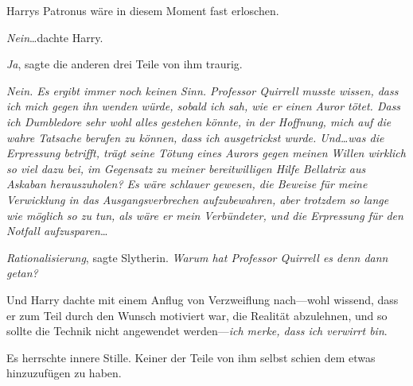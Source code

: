 Harrys Patronus wäre in diesem Moment fast erloschen.

\emph{Nein}…dachte Harry.

\emph{Ja}, sagte die anderen drei Teile von ihm traurig.

\emph{Nein. Es ergibt immer noch keinen Sinn. Professor Quirrell musste wissen, dass ich mich gegen ihn wenden würde, sobald ich sah, wie er einen Auror tötet. Dass ich Dumbledore sehr wohl alles gestehen könnte, in der Hoffnung, mich auf die wahre Tatsache berufen zu können, dass ich ausgetrickst wurde. Und…was die Erpressung betrifft, trägt seine Tötung eines Aurors gegen meinen Willen wirklich so viel dazu bei, im Gegensatz zu meiner bereitwilligen Hilfe Bellatrix aus Askaban herauszuholen? Es wäre schlauer gewesen, die Beweise für meine Verwicklung in das Ausgangsverbrechen aufzubewahren, aber trotzdem so lange wie möglich so zu tun, als wäre er mein Verbündeter, und die Erpressung für den Notfall aufzusparen}…

\emph{Rationalisierung}, sagte Slytherin. \emph{Warum hat Professor Quirrell es denn dann getan?}

Und Harry dachte mit einem Anflug von Verzweiflung nach—wohl wissend, dass er zum Teil durch den Wunsch motiviert war, die Realität abzulehnen, und so sollte die Technik nicht angewendet werden—\emph{ich merke, dass ich verwirrt bin}.

Es herrschte innere Stille. Keiner der Teile von ihm selbst schien dem etwas hinzuzufügen zu haben.

